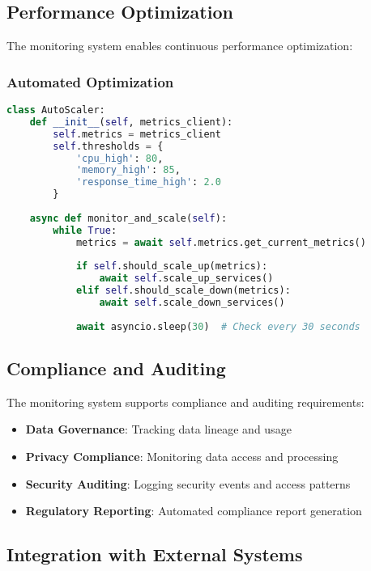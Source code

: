 \subsection{Performance Optimization}

The monitoring system enables continuous performance optimization:

\subsubsection{Automated Optimization}
\begin{lstlisting}[language=python, caption=Auto-scaling Implementation]
class AutoScaler:
    def __init__(self, metrics_client):
        self.metrics = metrics_client
        self.thresholds = {
            'cpu_high': 80,
            'memory_high': 85,
            'response_time_high': 2.0
        }
        
    async def monitor_and_scale(self):
        while True:
            metrics = await self.metrics.get_current_metrics()
            
            if self.should_scale_up(metrics):
                await self.scale_up_services()
            elif self.should_scale_down(metrics):
                await self.scale_down_services()
                
            await asyncio.sleep(30)  # Check every 30 seconds
\end{lstlisting}

\subsection{Compliance and Auditing}

The monitoring system supports compliance and auditing requirements:

\begin{itemize}
    \item \textbf{Data Governance}: Tracking data lineage and usage
    \item \textbf{Privacy Compliance}: Monitoring data access and processing
    \item \textbf{Security Auditing}: Logging security events and access patterns
    \item \textbf{Regulatory Reporting}: Automated compliance report generation
\end{itemize}

\subsection{Integration with External Systems}

